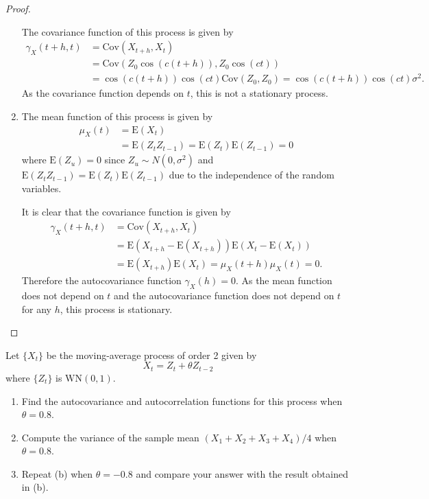 \documentclass[12pt]{article}
\theoremstyle{definition}
\newenvironment{custompbm}[1]
  {\renewcommand\theproblem{#1}\problem}
  {\endproblem}
\newcommand{\E}{\text{E}}
\newcommand{\Co}[2]{\text{Cov}({#1}, {#2})}
\newcommand{\mx}[1][t]{\mu_X({#1})}
\newcommand{\gx}[2]{\gamma_X({#1}, {#2})}
\begin{document}
\begin{proof}
\begin{enumerate}
      The covariance function of this process is given by
      \begin{align*}
        \gx{t+h}{t} &= \Co{X_{t+h}}{X_t} \\
        &= \Co{Z_0\cos(c(t+h))}{Z_0\cos(ct)}\\
        &= \cos(c(t+h))\cos(ct)\Co{Z_0}{Z_0} = \cos(c(t+h))\cos(ct)\sigma^2.
      \end{align*}
      As the covariance function depends on $t$, this is not a stationary
      process.
    \item The mean function of this process is given by
      \begin{align*}
        \mx &= \E(X_t) \\
        &= \E(Z_t Z_{t-1}) = \E(Z_t)\E(Z_{t-1}) = 0
      \end{align*}
      where $\E(Z_u) = 0$ since $Z_u \sim N(0, \sigma^2)$ and
      $\E(Z_t Z_{t-1})=\E(Z_t)\E(Z_{t-1})$ due to the independence of the
      random variables.

      It is clear that the covariance function is given by
      \begin{align*}
        \gx{t+h}{t} &= \Co{X_{t+h}}{X_t} \\
        &= \E(X_{t+h} - \E(X_{t+h}))\E(X_t - \E(X_t)) \\
        &= \E(X_{t+h})\E(X_t) = \mu_X(t+h)\mu_X(t) = 0.
      \end{align*}
      Therefore the autocovariance function $\gamma_X(h) = 0$.
      As the mean function does not depend on $t$ and the autocovariance function
      does not depend on $t$ for any $h$, this process is stationary.
  \end{enumerate}
\end{proof}


\begin{custompbm}{1.5}
  Let $\{ X_t \}$ be the moving-average process of order 2 given by
  \[
    X_t = Z_t + \theta Z_{t-2}
  \]
  where $\{ Z_t \}$ is $\text{WN}(0, 1).$
  \begin{enumerate}
    \item Find the autocovariance and autocorrelation functions for this process
      when $\theta = 0.8$.
    \item Compute the variance of the sample mean $(X_1 + X_2 + X_3 + X_4) / 4$
      when $\theta = 0.8$.
    \item Repeat (b) when $\theta = -0.8$ and compare your answer with the result
      obtained in (b).
  \end{enumerate}
\end{custompbm}
\end{document}
